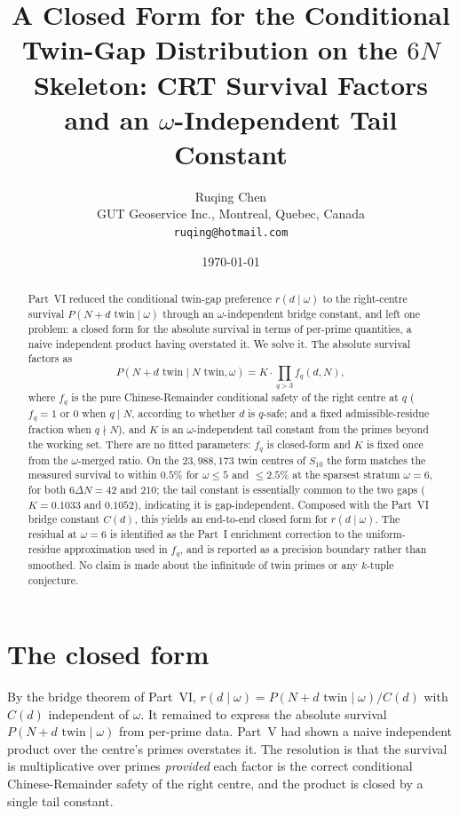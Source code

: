 \documentclass[11pt]{article}
\title{A Closed Form for the Conditional Twin-Gap Distribution on the $6N$
Skeleton: CRT Survival Factors and an $\omega$-Independent Tail Constant}
\author{Ruqing Chen\\
\small GUT Geoservice Inc., Montreal, Quebec, Canada\\
\small \texttt{ruqing@hotmail.com}}
\date{\today}
\begin{document}
\maketitle

\begin{abstract}
Part~VI reduced the conditional twin-gap preference $r(d\mid\omega)$ to the
right-centre survival $P(N{+}d\text{ twin}\mid\omega)$ through an
$\omega$-independent bridge constant, and left one problem: a closed form for the
absolute survival in terms of per-prime quantities, a naive independent product
having overstated it. We solve it. The absolute survival factors as
\[
  P(N{+}d\text{ twin}\mid N\text{ twin},\omega)=K\cdot\prod_{q>3} f_q(d,N),
\]
where $f_q$ is the pure Chinese-Remainder conditional safety of the right centre
at $q$ ($f_q=1$ or $0$ when $q\mid N$, according to whether $d$ is $q$-safe; and a
fixed admissible-residue fraction when $q\nmid N$), and $K$ is an
$\omega$-independent tail constant from the primes beyond the working set. There
are no fitted parameters: $f_q$ is closed-form and $K$ is fixed once from the
$\omega$-merged ratio. On the $23{,}988{,}173$ twin centres of $S_{10}$ the form
matches the measured survival to within $0.5\%$ for $\omega\leq5$ and $\leq2.5\%$
at the sparsest stratum $\omega=6$, for both $6\Delta N=42$ and $210$; the tail
constant is essentially common to the two gaps ($K=0.1033$ and $0.1052$),
indicating it is gap-independent. Composed with the Part~VI bridge constant
$C(d)$, this yields an end-to-end closed form for $r(d\mid\omega)$. The residual
at $\omega=6$ is identified as the Part~I enrichment correction to the
uniform-residue approximation used in $f_q$, and is reported as a precision
boundary rather than smoothed. No claim is made about the infinitude of twin
primes or any $k$-tuple conjecture.
\end{abstract}

\section{The closed form}

By the bridge theorem of Part~VI, $r(d\mid\omega)=P(N{+}d\text{ twin}\mid
\omega)/C(d)$ with $C(d)$ independent of $\omega$. It remained to express the
absolute survival $P(N{+}d\text{ twin}\mid\omega)$ from per-prime data. Part~V
had shown a naive independent product over the centre's primes overstates it.
The resolution is that the survival is multiplicative over primes \emph{provided}
each factor is the correct conditional Chinese-Remainder safety of the right
centre, and the product is closed by a single tail constant.
\end{document}
